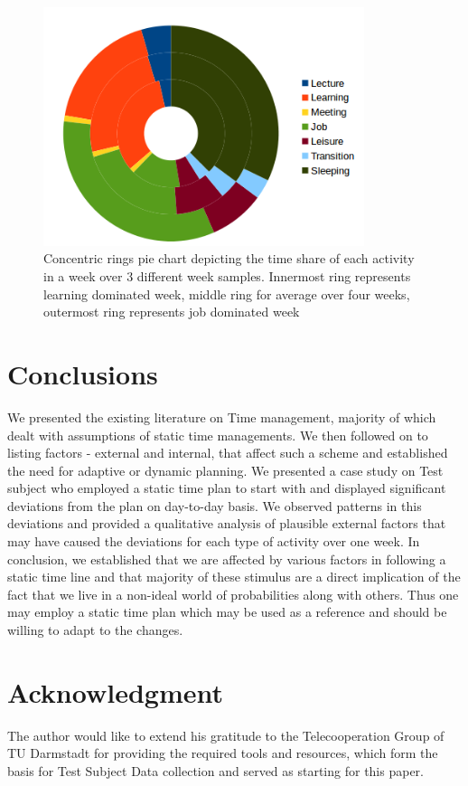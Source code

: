 \documentclass[conference]{IEEEtran}
\begin{document}
\begin{figure}[hb]
  \centering
  \includegraphics[width=3.7in]{donut}
  \caption[]
   {Concentric rings pie chart depicting the time share of each activity in a week over 3 different week samples. Innermost ring represents learning dominated week, middle ring for average over four weeks, outermost ring represents job dominated week}
\end{figure}


\section{Conclusions}
We presented the existing literature on Time management, majority of which dealt with assumptions of static time managements. We then followed on to listing factors - external and internal, that affect such a scheme and established the need for adaptive or dynamic planning. We presented a case study on Test subject who employed a static time plan to start with and displayed significant deviations from the plan on day-to-day basis. We observed patterns in this deviations and provided a qualitative analysis of plausible external factors that may have caused the deviations for each type of activity over one week. In conclusion, we established that we are affected by various factors in following a static time line and that majority of these stimulus are a direct implication of the fact that we live in a non-ideal world of probabilities along with others. Thus one may employ a static time plan which may be used as a reference and should be willing to adapt to the changes.

\section*{Acknowledgment}
The author would like to extend his gratitude to the Telecooperation Group of TU Darmstadt for providing the required tools and resources, which form the basis for Test Subject Data collection and served as starting for this paper.
\end{document}
